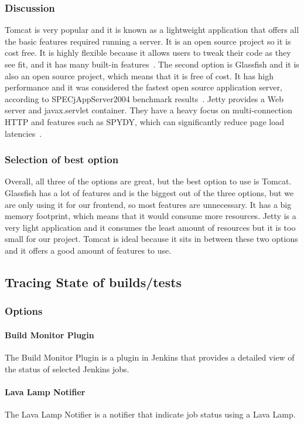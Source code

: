 \documentclass[10pt,letterpaper,onecolumn,draftclsnofoot]{IEEEtran}
\begin{document}
\subsubsection{Discussion}
Tomcat is very popular and it is known as a lightweight application that offers all the basic features required running a server.
It is an open source project so it is cost free.
It is highly flexible because it allows users to tweak their code as they see fit, and it has many built-in features~\cite{tomcat}.
The second option is Glassfish and it is also an open source project, which means that it is free of cost.
It has high performance and it was considered the fastest open source application server, according to SPECjAppServer2004 benchmark results~\cite{glassfish}.
Jetty provides a Web server and javax.servlet container.
They have a heavy focus on multi-connection HTTP and features such as SPYDY, which can significantly reduce page load latencies~\cite{jetty}.
\subsubsection{Selection of best option}
Overall, all three of the options are great, but the best option to use is Tomcat.
Glassfish has a lot of features and is the biggest out of the three options, but we are only using it for our frontend, so most features are unnecessary.
It has a big memory footprint, which means that it would consume more resources.
Jetty is a very light application and it consumes the least amount of resources but it is too small for our project.
Tomcat is ideal because it sits in between these two options and it offers a good amount of features to use.

\subsection{Tracing State of builds/tests}
\subsubsection{Options}
\paragraph{Build Monitor Plugin}
The Build Monitor Plugin is a plugin in Jenkins that provides a detailed view of the status of selected Jenkins jobs.
\paragraph{Lava Lamp Notifier}
The Lava Lamp Notifier is a notifier that indicate job status using a Lava Lamp.
\end{document}
